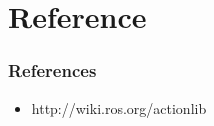 \documentclass{beamer}
\begin{document}
\section{Reference}
	\begin{frame}
		\frametitle{References}
		\begin{itemize}
			
			\item{http://wiki.ros.org/actionlib}
		\end{itemize}
	\end{frame}
\end{document}
